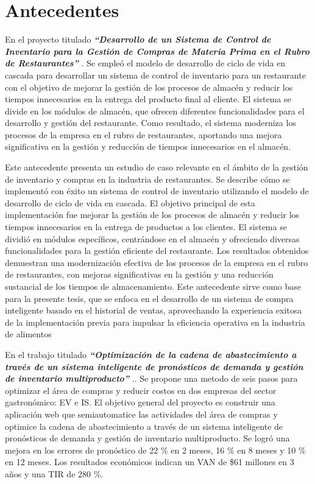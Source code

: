 \section{Antecedentes}
En el proyecto titulado \textbf{\textit{“Desarrollo de un Sistema de Control de Inventario para la Gestión de Compras de Materia Prima en el Rubro de Restaurantes”}} \cite{condorena2017desarrollo}. Se empleó el modelo de desarrollo de ciclo de vida en cascada para desarrollar un sistema de control de inventario para un restaurante con el objetivo de mejorar la gestión de los procesos de almacén y reducir los tiempos innecesarios en la entrega del producto final al cliente. El sistema se divide en los módulos de almacén, que ofrecen diferentes funcionalidades para el desarrollo y gestión del restaurante. Como resultado, el sistema moderniza los procesos de la empresa en el rubro de restaurantes, aportando una mejora significativa en la gestión y reducción de tiempos innecesarios en el almacén. 

\vspace{1\baselineskip}
Este antecedente presenta un estudio de caso relevante en el ámbito de la gestión de inventario y compras en la industria de restaurantes. Se describe cómo se implementó con éxito un sistema de control de inventario utilizando el modelo de desarrollo de ciclo de vida en cascada. El objetivo principal de esta implementación fue mejorar la gestión de los procesos de almacén y reducir los tiempos innecesarios en la entrega de productos a los clientes. El sistema se dividió en módulos específicos, centrándose en el almacén y ofreciendo diversas funcionalidades para la gestión eficiente del restaurante. Los resultados obtenidos demuestran una modernización efectiva de los procesos de la empresa en el rubro de restaurantes, con mejoras significativas en la gestión y una reducción sustancial de los tiempos de almacenamiento. Este antecedente sirve como base para la presente tesis, que se enfoca en el desarrollo de un sistema de compra inteligente basado en el historial de ventas, aprovechando la experiencia exitosa de la implementación previa para impulsar la eficiencia operativa en la industria de alimentos

\vspace{1\baselineskip}
En el trabajo titulado \textbf{\textit{ “Optimización de la cadena de abastecimiento a través de un sistema inteligente de pronósticos de demanda y gestión de inventario multiproducto”}} \cite{pacheco2015rediseno}.. Se propone una metodo de seis pasos para optimizar el área de compras y reducir costos en dos empresas del sector gastronómico: EV e IS. El objetivo general del proyecto es construir una aplicación web que semiautomatice las actividades del área de compras y optimice la cadena de abastecimiento a través de un sistema inteligente de pronósticos de demanda y gestión de inventario multiproducto. Se logró una mejora en los errores de pronóstico de 22 \%   en 2 meses, 16 \% en 8 meses y 10 \% en 12 meses. Los resultados económicos indican un VAN de \$61 millones en 3 años y una TIR de 280 \%.

